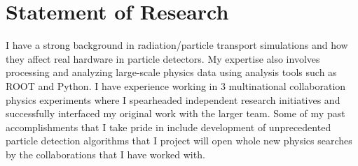 \documentclass[11pt]{article} %
\begin{document}
%


\clearpage
\section{Statement of Research}

I have a strong background in radiation/particle transport simulations and how
they affect real hardware in particle detectors. My expertise also involves
processing and analyzing large-scale physics data using analysis tools such as
ROOT and Python. I have experience working in 3 multinational collaboration
physics experiments where I spearheaded independent research initiatives and
successfully interfaced my original work with the larger team. Some of my past
accomplishments that I take pride in include development of unprecedented
particle detection algorithms that I project will open whole new physics
searches by the collaborations that I have worked with.
\end{document}
